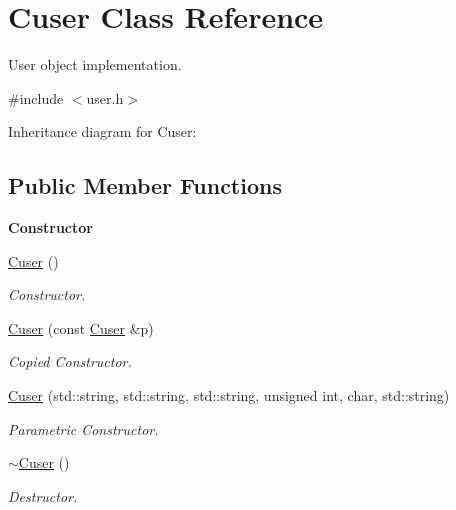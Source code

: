 \hypertarget{class_cuser}{\section{Cuser Class Reference}
\label{class_cuser}
}


User object implementation.  




{\ttfamily \#include $<$user.\+h$>$}



Inheritance diagram for Cuser\+:
\subsection*{Public Member Functions}
\begin{Indent}{\bf Constructor}\par
\begin{DoxyCompactItemize}
\item 
\hyperlink{class_cuser_a28d26161b1076a72f30e41d52132e636}{Cuser} ()
\begin{DoxyCompactList}\small\item\em Constructor. \end{DoxyCompactList}\item 
\hyperlink{class_cuser_a6c2305c658e82cd50ec20778069b1539}{Cuser} (const \hyperlink{class_cuser}{Cuser} \&p)
\begin{DoxyCompactList}\small\item\em Copied Constructor. \end{DoxyCompactList}\item 
\hyperlink{class_cuser_a981f08f7e90363568271eb6d7cfb0dcc}{Cuser} (std\+::string, std\+::string, std\+::string, unsigned int, char, std\+::string)
\begin{DoxyCompactList}\small\item\em Parametric Constructor. \end{DoxyCompactList}\item 
\hypertarget{class_cuser_a42e6967197e231f8a62d5d2c86451ca4}{\hyperlink{class_cuser_a42e6967197e231f8a62d5d2c86451ca4}{$\sim$\+Cuser} ()}\label{class_cuser_a42e6967197e231f8a62d5d2c86451ca4}

\begin{DoxyCompactList}\small\item\em Destructor. \end{DoxyCompactList}\end{DoxyCompactItemize}
\end{Indent}
